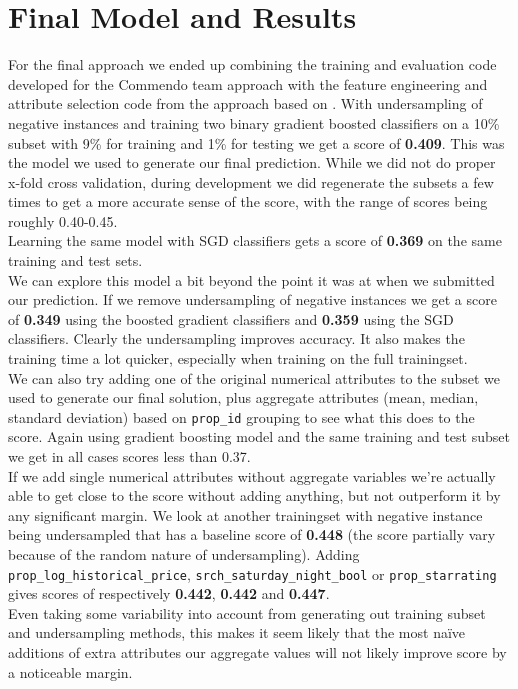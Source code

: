 \documentclass{llncs}
\begin{document}
\section{Final Model and Results}
\label{sec:final_model}
For the final approach we ended up combining the training and evaluation code developed for the Commendo team approach with the feature engineering and attribute selection code from the approach based on \cite{DBLP:journals/corr/LiuXZYPLSW13}. With undersampling of negative instances and training two binary gradient boosted classifiers on a 10\% subset with 9\% for training and 1\% for testing we get a score of \textbf{0.409}. This was the model we used to generate our final prediction. While we did not do proper x-fold cross validation, during development we did regenerate the subsets a few times to get a more accurate sense of the score, with the range of scores being roughly 0.40-0.45.\\
Learning the same model with SGD classifiers gets a score of \textbf{0.369} on the same training and test sets. \\
We can explore this model a bit beyond the point it was at when we submitted our prediction. If we remove undersampling of negative instances we get a score of \textbf{0.349} using the boosted gradient classifiers and \textbf{0.359} using the SGD classifiers. Clearly the undersampling improves accuracy. It also makes the training time a lot quicker, especially when training on the full trainingset.\\
We can also try adding one of the original numerical attributes to the subset we used to generate our final solution, plus aggregate attributes (mean, median, standard deviation) based on \verb!prop_id! grouping to see what this does to the score. Again using gradient boosting model and the same training and test subset we get in all cases scores less than 0.37.\\
If we add single numerical attributes without aggregate variables we're actually able to get close to the score without adding anything, but not outperform it by any significant margin. We look at another trainingset with negative instance being undersampled that has a baseline score of \textbf{0.448} (the score partially vary because of the random nature of undersampling). Adding \verb!prop_log_historical_price!, \verb!srch_saturday_night_bool! or \verb!prop_starrating! gives scores of respectively \textbf{0.442}, \textbf{0.442} and \textbf{0.447}.\\
Even taking some variability into account from generating out training subset and undersampling methods, this makes it seem likely that the most na\"ive additions of extra attributes our aggregate values will not likely improve score by a noticeable margin.
\end{document}
